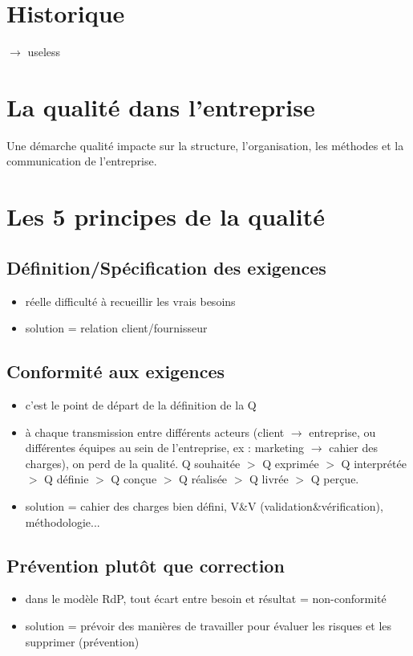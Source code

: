 	\section{Historique} 
		$\rightarrow$ useless
	
	\section{La qualité dans l'entreprise}
		Une démarche qualité impacte sur la structure, l'organisation, les méthodes et la communication de l'entreprise. 
	
	\section{Les 5 principes de la qualité}
		\subsection{Définition/Spécification des exigences}
			\begin{itemize}
			\item réelle difficulté à recueillir les vrais besoins
			\item solution = relation client/fournisseur
			\end{itemize}
		\subsection{Conformité aux exigences}
			\begin{itemize}
			\item c’est le point de départ de la définition de la Q
			\item à chaque transmission entre différents acteurs (client $\rightarrow$ entreprise, ou différentes équipes au sein de l’entreprise, ex : marketing $\rightarrow$ cahier des charges), on perd de la qualité. 
			Q souhaitée $>$ Q exprimée $>$ Q interprétée $>$ Q définie $>$ Q conçue $>$ Q réalisée $>$ Q livrée $>$ Q perçue. 
			\item solution = cahier des charges bien défini, V\&V (validation\&vérification), méthodologie...
			\end{itemize}
		\subsection{Prévention plutôt que correction}
			\begin{itemize}
			\item dans le modèle RdP, tout écart entre besoin et résultat = non-conformité
			\item solution = prévoir des manières de travailler pour évaluer les risques et les supprimer (prévention)
			\end{itemize}
